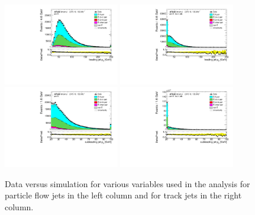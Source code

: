 \documentclass[letterpaper,12pt]{article}
\begin{document}
 \begin{figure}%
	\centering
	\includegraphics[width=0.45\textwidth]{figs_support/plots_withoutHighpT/DataMC_h_J0_pt.pdf}
	\includegraphics[width=0.45\textwidth]{figs_support/plots_withoutHighpT/DataMC_h_J0_pttrackjet.pdf}\\
	\includegraphics[width=0.45\textwidth]{figs_support/plots_withoutHighpT/DataMC_h_J1_pt.pdf}
	\includegraphics[width=0.45\textwidth]{figs_support/plots_withoutHighpT/DataMC_h_J1_pttrackjet.pdf}\\
	\caption{Data versus simulation for various variables used in the analysis for 
	particle flow jets in the left column and for track jets in the right column.}
	\label{fig:kinematic_distributions_standard}
	\end{figure}
	
\end{document}

